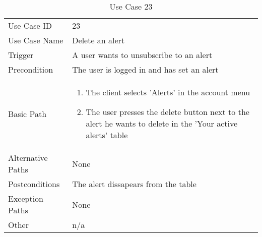 \begin{table}[H]
\centering
\label{table-use-case-23}
\begin{tabular}{|p{3cm}|p{10cm}}
Use Case ID       & 23                                                           
\\
Use Case Name     & Delete an alert                                                         
\\
Trigger           & A user wants to unsubscribe to an alert                                          
\\
Precondition      & The user is logged in and has set an alert                                                
\\
Basic Path        & \begin{enumerate}
\item The client selects 'Alerts' in the account menu
\item The user presses the delete button next to the alert he wants to delete
in the 'Your active alerts' table
\end{enumerate} 
     \\
Alternative Paths & None                          \\
Postconditions    & The alert dissapears from the table                                                         
\\
Exception Paths   & None                          \\
Other             & n/a                                                                                                                                                                                                        
\end{tabular}
\caption{Use Case 23}
\end{table}

